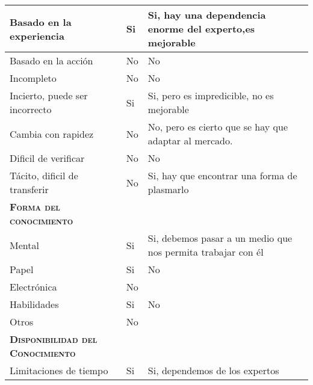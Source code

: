 \begin{table}[H]
{\begin{tabular}{|l|l|l|}
		Basado en la experiencia & \multicolumn{1}{p{1.0cm}|}{Si} & \multicolumn{1}{p{13.0cm}|}{Si, hay una dependencia enorme del experto,es mejorable}\\
		\hline

		Basado en la acción & \multicolumn{1}{p{1.0cm}|}{No} & \multicolumn{1}{p{13.0cm}|}{No}\\
		\hline

		Incompleto & \multicolumn{1}{p{1.0cm}|}{No} & \multicolumn{1}{p{13.0cm}|}{No}\\
		\hline

		Incierto, puede ser incorrecto & \multicolumn{1}{p{1.0cm}|}{Si} & \multicolumn{1}{p{13.0cm}|}{Si, pero es impredicible, no es mejorable}\\
		\hline

		Cambia con rapidez & \multicolumn{1}{p{1.0cm}|}{No} & \multicolumn{1}{p{13.0cm}|}{No, pero es cierto que se hay que adaptar al mercado.}\\
		\hline

		Dificil de verificar & \multicolumn{1}{p{1.0cm}|}{No} & \multicolumn{1}{p{13.0cm}|}{No}\\
		\hline

		Tácito, dificil de transferir& \multicolumn{1}{p{1.0cm}|}{No} & \multicolumn{1}{p{13.0cm}|}{Si, hay que encontrar una forma de plasmarlo}\\
		\hline

		\textsc {\textbf{Forma del conocimiento}}& \multicolumn{1}{p{1.0cm}|}{} & \multicolumn{1}{p{13.0cm}|}{}\\
		\hline

		Mental & \multicolumn{1}{p{1.0cm}|}{Si} & \multicolumn{1}{p{13.0cm}|}{Si, debemos pasar a un medio que nos permita trabajar con él}\\
		\hline

		Papel & \multicolumn{1}{p{1.0cm}|}{Si} & \multicolumn{1}{p{13.0cm}|}{No}\\
		\hline

		Electrónica & \multicolumn{1}{p{1.0cm}|}{No} & \multicolumn{1}{p{13.0cm}|}{}\\
		\hline

		Habilidades & \multicolumn{1}{p{1.0cm}|}{Si} & \multicolumn{1}{p{13.0cm}|}{No}\\
		\hline

		Otros & \multicolumn{1}{p{1.0cm}|}{No} & \multicolumn{1}{p{13.0cm}|}{}\\
		\hline

		\textsc {\textbf{Disponibilidad del Conocimiento}} & \multicolumn{1}{p{1.0cm}|}{} & \multicolumn{1}{p{13.0cm}|}{}\\
		\hline
		Limitaciones de tiempo& \multicolumn{1}{p{1.0cm}|}{Si} & \multicolumn{1}{p{13.0cm}|}{Si, dependemos de los expertos}\\
		\hline


\end{tabular}}
\end{table}
